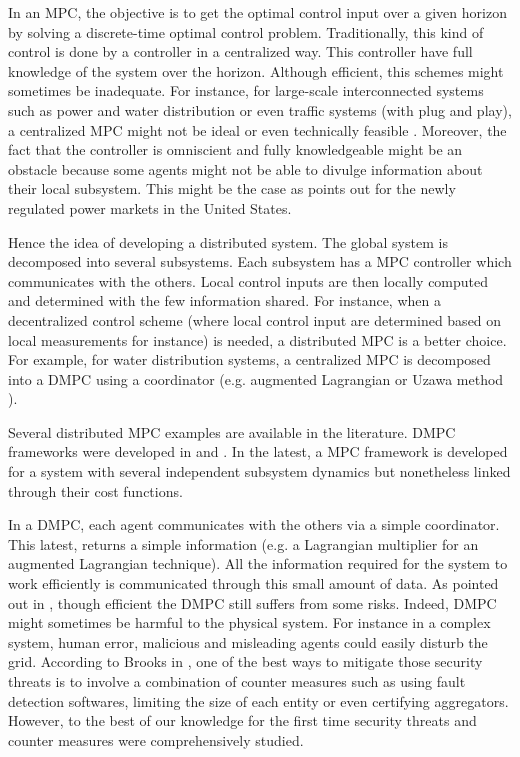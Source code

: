 \documentclass[conference, peerreview]{IEEEtran}
\begin{document}
In an MPC, the objective is to get the optimal control input over a given horizon by solving a discrete-time optimal control problem. Traditionally, this kind of control is done by a controller in a centralized way.  This controller have full knowledge of the system over the horizon. Although efficient, this schemes might sometimes be inadequate. For instance,  for large-scale interconnected systems such as power and water distribution or even traffic systems (with plug and play), a centralized MPC might not be ideal or even technically feasible \cite{Jia}. Moreover, the fact that the controller is omniscient and  fully knowledgeable might be an obstacle because some agents might not be able to divulge information about their local subsystem. This might be the case as \cite{Campo} points out for the newly regulated power markets in the United States.

Hence the idea of developing a distributed system. The global system is decomposed into several subsystems. Each subsystem has a MPC controller which communicates with the others. Local control inputs are then locally computed and determined with the few information shared. For instance, when a decentralized control scheme (where local control input are determined based on local measurements for instance) is needed, a distributed MPC is a better choice. For example, for water distribution systems, a centralized MPC is decomposed into a DMPC using a coordinator (e.g. augmented Lagrangian \cite{Campo} or Uzawa method \cite{Cohen}).

Several distributed MPC examples are available in the literature. DMPC frameworks were developed in \cite{Acar, Sawa} and \cite{ Dunbar}. In the latest, a MPC framework is developed for a system with several independent subsystem dynamics but nonetheless linked through their cost functions. 

In a DMPC, each agent communicates with the others via a simple coordinator. This latest, returns a simple information (e.g. a Lagrangian multiplier for an augmented Lagrangian technique). All the information required for the system to work efficiently is communicated through this small amount of data. As pointed out  in \cite{Brooks}, though efficient the DMPC still suffers from some risks. Indeed, DMPC might sometimes be harmful to the physical system. For instance in a complex system, human error, malicious and misleading agents could easily disturb the grid. According to Brooks in \cite{Brooks}, one of the best ways to mitigate those security threats is to involve a combination of counter measures such as using fault detection softwares, limiting the size of each entity or even certifying aggregators. However, to the best of our knowledge for the first time security threats and counter measures were comprehensively studied. 
\end{document}
